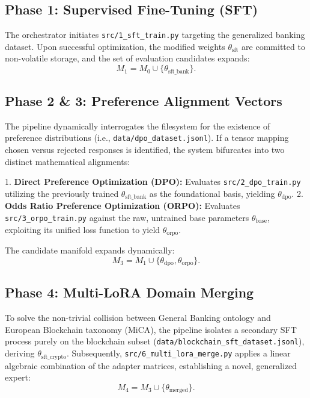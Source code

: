 \documentclass[12pt,a4paper]{report}
\begin{document}
\subsection{Phase 1: Supervised Fine-Tuning (SFT)}
The orchestrator initiates \texttt{src/1_sft_train.py} targeting the generalized banking dataset. Upon successful optimization, the modified weights $\theta_{\text{sft}}$ are committed to non-volatile storage, and the set of evaluation candidates expands:
\begin{equation}
    M_{1} = M_{0} \cup \{\theta_{\text{sft\_bank}}\}. 
\end{equation}

\subsection{Phase 2 & 3: Preference Alignment Vectors}
The pipeline dynamically interrogates the filesystem for the existence of preference distributions (i.e., \texttt{data/dpo_dataset.jsonl}). If a tensor mapping chosen versus rejected responses is identified, the system bifurcates into two distinct mathematical alignments:

1. \textbf{Direct Preference Optimization (DPO):} Evaluates \texttt{src/2_dpo_train.py} utilizing the previously trained $\theta_{\text{sft\_bank}}$ as the foundational basis, yielding $\theta_{\text{dpo}}$.
2. \textbf{Odds Ratio Preference Optimization (ORPO):} Evaluates \texttt{src/3_orpo_train.py} against the raw, untrained base parameters $\theta_{\text{base}}$, exploiting its unified loss function to yield $\theta_{\text{orpo}}$.

The candidate manifold expands dynamically:
\begin{equation}
    M_{3} = M_{1} \cup \{\theta_{\text{dpo}}, \theta_{\text{orpo}}\}. 
\end{equation}

\subsection{Phase 4: Multi-LoRA Domain Merging}
To solve the non-trivial collision between General Banking ontology and European Blockchain taxonomy (MiCA), the pipeline isolates a secondary SFT process purely on the blockchain subset (\texttt{data/blockchain_sft_dataset.jsonl}), deriving $\theta_{\text{sft\_crypto}}$. Subsequently, \texttt{src/6_multi_lora_merge.py} applies a linear algebraic combination of the adapter matrices, establishing a novel, generalized expert:
\begin{equation}
    M_{4} = M_{3} \cup \{\theta_{\text{merged}}\}. 
\end{equation}
\end{document}
